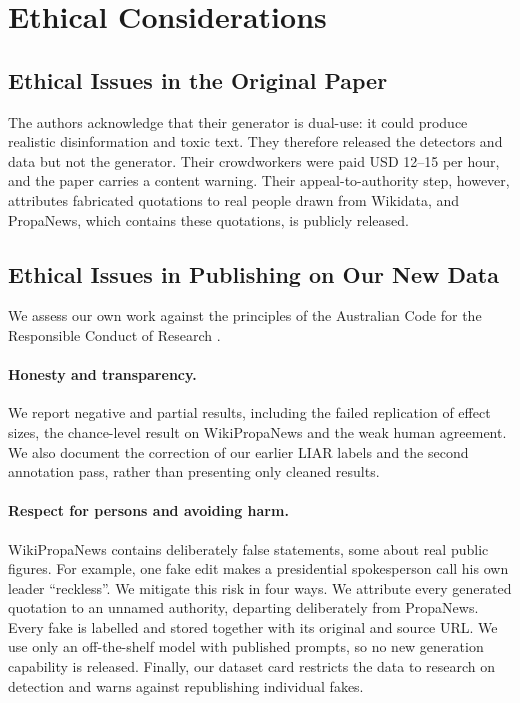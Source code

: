 \documentclass[11pt]{article}
\begin{document}
\section{Ethical Considerations}
\label{sec:ethics}

\subsection{Ethical Issues in the Original Paper}

The authors acknowledge that their generator is dual-use: it could produce realistic disinformation and toxic text. They therefore released the detectors and data but not the generator. Their crowdworkers were paid USD 12--15 per hour, and the paper carries a content warning. Their appeal-to-authority step, however, attributes fabricated quotations to real people drawn from Wikidata, and PropaNews, which contains these quotations, is publicly released.

\subsection{Ethical Issues in Publishing on Our New Data}

We assess our own work against the principles of the Australian Code for the Responsible Conduct of Research \citep{australiancode2018}.

\paragraph{Honesty and transparency.} We report negative and partial results, including the failed replication of effect sizes, the chance-level result on WikiPropaNews and the weak human agreement. We also document the correction of our earlier LIAR labels and the second annotation pass, rather than presenting only cleaned results.

\paragraph{Respect for persons and avoiding harm.} WikiPropaNews contains deliberately false statements, some about real public figures. For example, one fake edit makes a presidential spokesperson call his own leader ``reckless''. We mitigate this risk in four ways. We attribute every generated quotation to an unnamed authority, departing deliberately from PropaNews. Every fake is labelled and stored together with its original and source URL. We use only an off-the-shelf model with published prompts, so no new generation capability is released. Finally, our dataset card restricts the data to research on detection and warns against republishing individual fakes.
\end{document}
